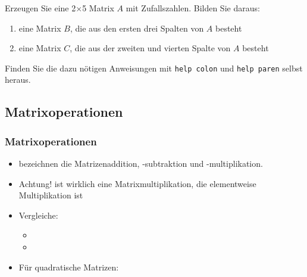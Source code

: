     \secMexercise
    \begin{frame}
        \frameMexercise
        \begin{exercise}
            \sloppy
            Erzeugen Sie eine 2$\times$5 Matrix $A$ mit Zufallszahlen. Bilden Sie daraus:\\
            \begin{enumerate}
                \item eine Matrix $B$, die aus den ersten drei Spalten von $A$ besteht
                \item eine Matrix $C$, die aus der zweiten und vierten Spalte von $A$ besteht
            \end{enumerate}

            \vspace{0.5cm}

            Finden Sie die dazu nötigen Anweisungen mit \texttt{help colon} und \texttt{help paren} selbst heraus.
        \end{exercise}
    \end{frame}

    \subsection{Matrixoperationen}
    \begin{frame}
        \frametitle{Matrixoperationen}
        \begin{itemize}
            \item {} bezeichnen die Matrizenaddition, -subtraktion und -multiplikation.
            \item \alert{Achtung!}  ist wirklich eine Matrixmultiplikation, die elementweise Multiplikation ist 
            \item Vergleiche:
            \begin{itemize}
                \item {}
                \item \matlabInput{[1 2; -2 5] * [3 6; 0 -1]}
            \end{itemize}
            \item Für quadratische Matrizen:
        \end{itemize}
    \end{frame}

